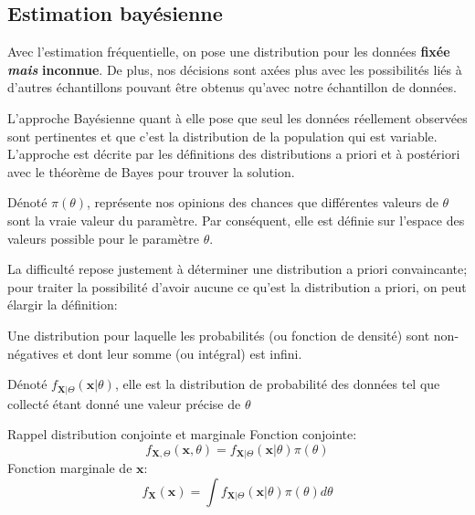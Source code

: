 \documentclass[10pt, french]{article}
\begin{document}
\begin{multicols*}{3}
\setcounter{section}{12}
\section{Estimation bayésienne}

Avec l'estimation fréquentielle, on pose une distribution pour les données \textbf{fixée} \textit{\textbf{mais}} \textbf{inconnue}. De plus, nos décisions sont axées plus avec les possibilités liés à d'autres échantillons pouvant être obtenus qu'avec notre échantillon de données.

L'approche Bayésienne quant à elle pose que seul les données réellement observées sont pertinentes et que c'est la distribution de la population qui est variable.
L'approche est décrite par les définitions des distributions a priori et à postériori avec le théorème de Bayes pour trouver la solution.

\begin{definition}
Dénoté $\pi(\theta)$, représente nos opinions des chances que différentes valeurs de $\theta$ sont la vraie valeur du paramètre. 
Par conséquent, elle est définie sur l'espace des valeurs possible pour le paramètre $\theta$.
\end{definition}

La difficulté repose justement à déterminer une distribution a priori convaincante; pour traiter la possibilité d'avoir aucune ce qu'est la distribution a priori, on peut élargir la définition:
\begin{definition}
Une distribution pour laquelle les probabilités (ou fonction de densité) sont non-négatives et dont leur somme (ou intégral) est infini.
\end{definition}

\begin{definitionNOHFILL}
Dénoté $f_{\bm{X} | \Theta}(\bm{x} | \theta)$, elle est la distribution de probabilité des données tel que collecté étant donné une valeur précise de $\theta$ 
\end{definitionNOHFILL}

\begin{rappel}{Rappel distribution conjointe et marginale}
Fonction conjointe:
\begin{equation*}
	f_{\bm{X}, \Theta}(\bm{x}, \theta)
	=	f_{\bm{X}|\Theta}(\bm{x} | \theta) \pi(\theta)
\end{equation*}
Fonction marginale de $\bm{x}$:
\begin{equation*}
	f_{\bm{X}}(\bm{x})
	=	\int f_{\bm{X}|\Theta}(\bm{x} | \theta) \pi(\theta) d\theta
\end{equation*}
\end{rappel}


\end{multicols*}
\end{document}
